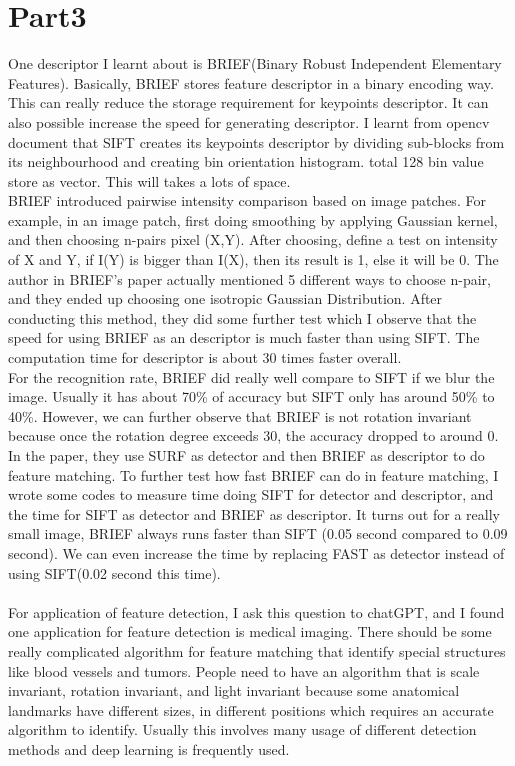 \documentclass{article}
\begin{document}
\section*{Part3}
One descriptor I learnt about is BRIEF(Binary Robust Independent Elementary Features).
Basically, BRIEF stores feature descriptor in a binary encoding way. This can really reduce the storage requirement for keypoints descriptor.
It can also possible increase the speed for generating descriptor.
I learnt from opencv document that SIFT creates its keypoints descriptor by dividing sub-blocks from its neighbourhood and creating bin orientation histogram.
total 128 bin value store as vector. This will takes a lots of space. 
\\
BRIEF introduced pairwise intensity comparison based on image patches.
For example, in an image patch, first doing smoothing by applying Gaussian kernel, and then choosing n-pairs pixel (X,Y).
After choosing, define a test on intensity of X and Y, if I(Y) is bigger than I(X), then its result is 1, else it will be 0.
The author in BRIEF's paper actually mentioned 5 different ways to choose n-pair, and they ended up choosing one isotropic Gaussian Distribution.
After conducting this method, they did some further test which I observe that the speed for using BRIEF as an descriptor is much faster than using SIFT.
The computation time for descriptor is about 30 times faster overall.
\\
For the recognition rate, BRIEF did really well compare to SIFT if we blur the image. 
Usually it has about 70\% of accuracy but SIFT only has around 50\% to 40\%.
However, we can further observe that BRIEF is not rotation invariant because once the rotation degree exceeds 30, the accuracy dropped to around 0.
\\
In the paper, they use SURF as detector and then BRIEF as descriptor to do feature matching.
To further test how fast BRIEF can do in feature matching, I wrote some codes to measure time doing SIFT for detector and descriptor, and the time for SIFT as detector and BRIEF as descriptor.
It turns out for a really small image, BRIEF always runs faster than SIFT (0.05 second compared to 0.09 second). We can even increase the time by replacing FAST as detector instead of using SIFT(0.02 second this time).\\
\\
For application of feature detection, I ask this question to chatGPT, and I found one application for feature detection is medical imaging.
There should be some really complicated algorithm for feature matching that identify special structures like blood vessels and tumors.
People need to have an algorithm that is scale invariant, rotation invariant, and light invariant because some anatomical landmarks have different sizes, in different positions which requires an accurate algorithm to identify.
Usually this involves many usage of different detection methods and deep learning is frequently used.
\end{document}
